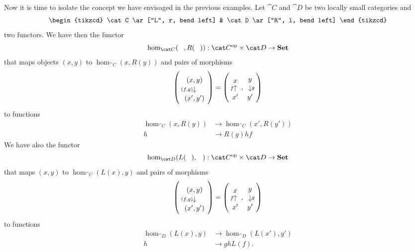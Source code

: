 Now it is time to isolate the concept we have envisaged in the previous examples. Let \(\cat C\) and \(\cat D\) be two locally small  categories and
\[\begin{tikzcd} \cat C \ar["L", r, bend left] & \cat D \ar["R", l, bend left] \end{tikzcd}\]
two functors. We have then the functor
\[\hom_{\cat C}(\void, R(\void)) : \opcat C \times \cat D \to \Set\]
that maps objects \((x, y)\) to \(\hom_{\cat C}(x, R(y))\) and pairs of morphisms
\[\left(\begin{tikzcd}[row sep=small](x, y) \ar["{(f, g)}", d, swap] \\ (x', y')\end{tikzcd}\right) = \left(\begin{tikzcd}[row sep=small]x \\ x' \ar["f", u]\end{tikzcd}, \begin{tikzcd}[row sep=small]y \ar["g", d] \\ y'\end{tikzcd}\right)\]
to functions
\[\begin{aligned}
\hom_{\cat C}(x, R(y)) &\to \hom_{\cat C}(x', R(y')) \\
h &\to R(g) h f
\end{aligned}\]
We have also the functor
\[\hom_{\cat D}(L(\void), \void) : \opcat C \times \cat D \to \Set\]
that maps \((x, y)\) to \(\hom_{\cat C}(L(x), y)\) and pairs of morphisms
\[\left(\begin{tikzcd}[row sep=small](x, y) \ar["{(f, g)}", d, swap] \\ (x', y')\end{tikzcd}\right) = \left(\begin{tikzcd}[row sep=small]x \\ x' \ar["f", u]\end{tikzcd}, \begin{tikzcd}[row sep=small]y \ar["g", d] \\ y'\end{tikzcd}\right)\]
to functions
\[\begin{aligned}
\hom_{\cat D}(L(x), y) &\to \hom_{\cat D}(L(x'), y') \\
h &\to g h L(f) .
\end{aligned}\]

